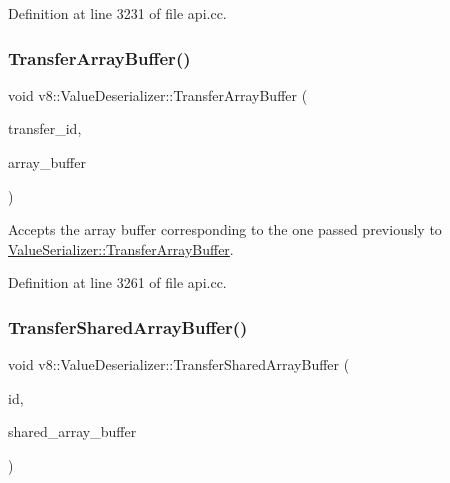 Definition at line 3231 of file api.\+cc.

\mbox{\label{classv8_1_1ValueDeserializer_a853acc2c7b30571d6719ddd92a48da3b}} 
\subsubsection{\texorpdfstring{Transfer\+Array\+Buffer()}{TransferArrayBuffer()}}
{\footnotesize\ttfamily void v8\+::\+Value\+Deserializer\+::\+Transfer\+Array\+Buffer (\begin{DoxyParamCaption}\item[{\mbox{\hyperlink{classuint32__t}{uint32\+\_\+t}}}]{transfer\+\_\+id,  }\item[{\mbox{\hyperlink{classv8_1_1Local}{Local}}$<$ \mbox{\hyperlink{classv8_1_1ArrayBuffer}{Array\+Buffer}} $>$}]{array\+\_\+buffer }\end{DoxyParamCaption})}

Accepts the array buffer corresponding to the one passed previously to \mbox{\hyperlink{classv8_1_1ValueSerializer_a27007f2530a496275ccf7b8846f1d9c5}{Value\+Serializer\+::\+Transfer\+Array\+Buffer}}. 

Definition at line 3261 of file api.\+cc.

\mbox{\label{classv8_1_1ValueDeserializer_a3730fe24f81054d6f75a1b23f77a0e6c}} 
\subsubsection{\texorpdfstring{Transfer\+Shared\+Array\+Buffer()}{TransferSharedArrayBuffer()}}
{\footnotesize\ttfamily void v8\+::\+Value\+Deserializer\+::\+Transfer\+Shared\+Array\+Buffer (\begin{DoxyParamCaption}\item[{\mbox{\hyperlink{classuint32__t}{uint32\+\_\+t}}}]{id,  }\item[{\mbox{\hyperlink{classv8_1_1Local}{Local}}$<$ \mbox{\hyperlink{classv8_1_1SharedArrayBuffer}{Shared\+Array\+Buffer}} $>$}]{shared\+\_\+array\+\_\+buffer }\end{DoxyParamCaption})}

